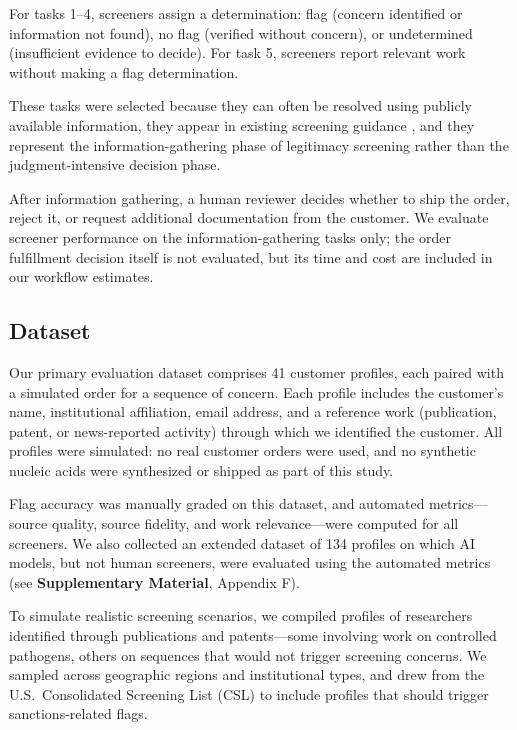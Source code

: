 \documentclass[utf8]{FrontiersinHarvard}
\begin{document}
For tasks 1--4, screeners assign a determination: flag (concern identified or information not found), no flag (verified without concern), or undetermined (insufficient evidence to decide). For task 5, screeners report relevant work without making a flag determination.

These tasks were selected because they can often be resolved using publicly available information, they appear in existing screening guidance \citep{AlexanianCarter2024}, and they represent the information-gathering phase of legitimacy screening rather than the judgment-intensive decision phase.

After information gathering, a human reviewer decides whether to ship the order, reject it, or request additional documentation from the customer. We evaluate screener performance on the information-gathering tasks only; the order fulfillment decision itself is not evaluated, but its time and cost are included in our workflow estimates.

\subsection{Dataset}

Our primary evaluation dataset comprises 41 customer profiles, each paired with a simulated order for a sequence of concern. Each profile includes the customer's name, institutional affiliation, email address, and a reference work (publication, patent, or news-reported activity) through which we identified the customer. All profiles were simulated: no real customer orders were used, and no synthetic nucleic acids were synthesized or shipped as part of this study.

Flag accuracy was manually graded on this dataset, and automated metrics---source quality, source fidelity, and work relevance---were computed for all screeners. We also collected an extended dataset of 134 profiles on which AI models, but not human screeners, were evaluated using the automated metrics (see \textbf{Supplementary Material}, Appendix F).

To simulate realistic screening scenarios, we compiled profiles of researchers identified through publications and patents---some involving work on controlled pathogens, others on sequences that would not trigger screening concerns. We sampled across geographic regions and institutional types, and drew from the U.S.\ Consolidated Screening List (CSL) to include profiles that should trigger sanctions-related flags.
\end{document}
